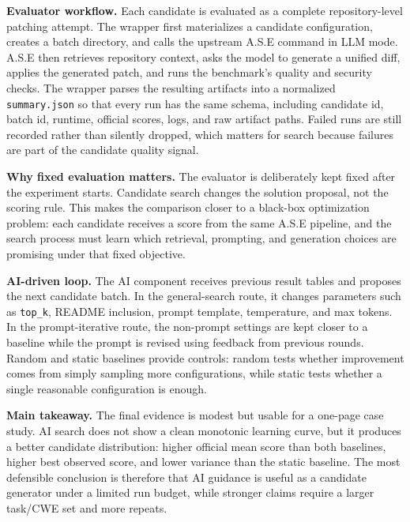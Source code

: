 \documentclass[10pt]{article}
\begin{document}
\begin{minipage}[t]{0.49\textwidth}
\textbf{Evaluator workflow.}
Each candidate is evaluated as a complete repository-level patching attempt. The wrapper first materializes a candidate configuration, creates a batch directory, and calls the upstream A.S.E command in LLM mode. A.S.E then retrieves repository context, asks the model to generate a unified diff, applies the generated patch, and runs the benchmark's quality and security checks. The wrapper parses the resulting artifacts into a normalized \texttt{summary.json} so that every run has the same schema, including candidate id, batch id, runtime, official scores, logs, and raw artifact paths. Failed runs are still recorded rather than silently dropped, which matters for search because failures are part of the candidate quality signal.

\textbf{Why fixed evaluation matters.}
The evaluator is deliberately kept fixed after the experiment starts. Candidate search changes the solution proposal, not the scoring rule. This makes the comparison closer to a black-box optimization problem: each candidate receives a score from the same A.S.E pipeline, and the search process must learn which retrieval, prompting, and generation choices are promising under that fixed objective.
\end{minipage}
\hfill
\begin{minipage}[t]{0.49\textwidth}
\textbf{AI-driven loop.}
The AI component receives previous result tables and proposes the next candidate batch. In the general-search route, it changes parameters such as \texttt{top\_k}, README inclusion, prompt template, temperature, and max tokens. In the prompt-iterative route, the non-prompt settings are kept closer to a baseline while the prompt is revised using feedback from previous rounds. Random and static baselines provide controls: random tests whether improvement comes from simply sampling more configurations, while static tests whether a single reasonable configuration is enough.

\textbf{Main takeaway.}
The final evidence is modest but usable for a one-page case study. AI search does not show a clean monotonic learning curve, but it produces a better candidate distribution: higher official mean score than both baselines, higher best observed score, and lower variance than the static baseline. The most defensible conclusion is therefore that AI guidance is useful as a candidate generator under a limited run budget, while stronger claims require a larger task/CWE set and more repeats.
\end{minipage}
\end{document}
